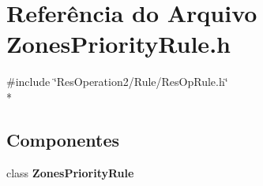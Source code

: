 \section{Referência do Arquivo Zones\+Priority\+Rule.\+h}
\label{_zones_priority_rule_8h}
{\ttfamily \#include \char`\"{}Res\+Operation2/\+Rule/\+Res\+Op\+Rule.\+h\char`\"{}}\\*
\subsection*{Componentes}
\begin{DoxyCompactItemize}
\item 
class {\bf Zones\+Priority\+Rule}
\end{DoxyCompactItemize}
